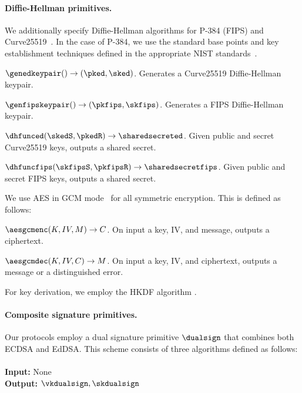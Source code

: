 \paragraph{Diffie-Hellman primitives.} We additionally specify Diffie-Hellman algorithms for P-384 (FIPS) and Curve25519~\cite{bernstein2006curve25519}. In the case of P-384, we use the standard base points and key establishment techniques defined in the appropriate NIST standards~\cite{nist80056a}.

\begin{description*}
\item $\genedkeypair() \rightarrow (\pked, \sked)$. Generates a Curve25519 Diffie-Hellman keypair.
\item $\genfipskeypair() \rightarrow (\pkfips, \skfips)$. Generates a FIPS Diffie-Hellman keypair.
\item $\dhfunced(\skedS, \pkedR) \rightarrow \sharedsecreted$. Given public and secret Curve25519 keys, outputs a shared secret.
\item $\dhfuncfips(\skfipsS, \pkfipsR) \rightarrow \sharedsecretfips$. Given public and secret FIPS keys, outputs a shared secret.
\end{description*}

We use AES in GCM mode~\cite{sp80038d} for all symmetric encryption. This is defined as follows:

\begin{description*}
\item $\aesgcmenc(K, IV, M) \rightarrow C$. On input a key, IV, and message, outputs a ciphertext.
\item $\aesgcmdec(K, IV, C) \rightarrow M$. On input a key, IV, and ciphertext, outputs a message or a distinguished {\sf error}.
\end{description*}

For key derivation, we employ the HKDF algorithm \cite{rfc5869}.
%
\paragraph{Composite signature primitives.} Our protocols employ a dual signature primitive ${\sf \dualsign}$ that combines both ECDSA and EdDSA. This scheme consists of three algorithms defined as follows: \\


{\underline {\bf \dualsignkeygen}} \\
{\bf Input:} None \\
{\bf Output:} $\vkdualsign, \skdualsign$ \\

